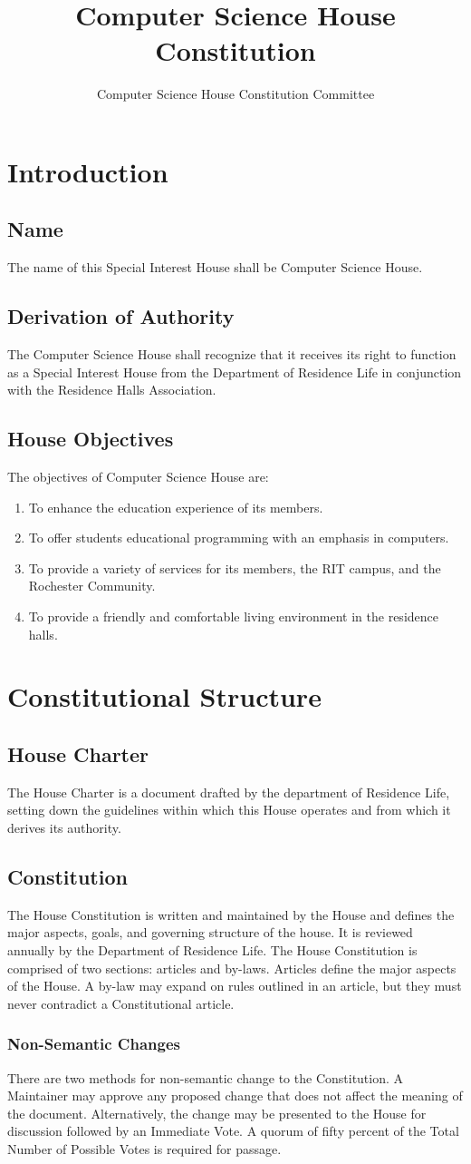 \documentclass{article}
\title{Computer Science House Constitution}
\author{Computer Science House Constitution Committee}
\date{\datechanged}
\newcommand{\article}[1]{\section{#1} \label{#1}}
\newcommand{\asection}[1]{\subsection{#1} \label{#1}}
\newcommand{\asubsection}[1]{\subsubsection{#1} \label{#1}}
\begin{document}
\maketitle

\article{Introduction}

\asection{Name}
The name of this Special Interest House shall be Computer Science House.

\asection{Derivation of Authority}
The Computer Science House shall recognize that it receives its right to function as a Special Interest House from the Department of Residence Life in conjunction with the Residence Halls Association.

\asection{House Objectives}
The objectives of Computer Science House are:
\begin{enumerate}
	\item To enhance the education experience of its members.
	\item To offer students educational programming with an emphasis in computers.
	\item To provide a variety of services for its members, the RIT campus, and the Rochester Community.
	\item To provide a friendly and comfortable living environment in the residence halls.
\end{enumerate}

\article{Constitutional Structure}

\asection{House Charter}
The House Charter is a document drafted by the department of Residence Life, setting down the guidelines within which this House operates and from which it derives its authority.

\asection{Constitution}
The House Constitution is written and maintained by the House and defines the major aspects, goals, and governing structure of the house. It is reviewed annually by the Department of Residence Life. The House Constitution is comprised of two sections: articles and by-laws. Articles define the major aspects of the House. A by-law may expand on rules outlined in an article, but they must never contradict a Constitutional article.

\asubsection{Non-Semantic Changes}
There are two methods for non-semantic change to the Constitution.
A Maintainer may approve any proposed change that does not affect the meaning of the document.
Alternatively, the change may be presented to the House for discussion followed by an Immediate Vote.
A quorum of fifty percent of the Total Number of Possible Votes is required for passage.
\end{document}
